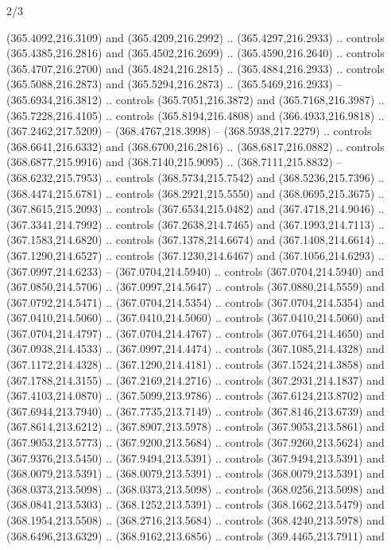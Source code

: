 \begin{flagdescription}{2/3}
\begin{scope}[xshift=0.5\flaglength,yshift=0.5\flagwidth,scale=\flagwidth/495.65]
\begin{scope}[y=0.8pt, x=0.8pt, yscale=-1,shift={(-463.76,-309.78)}]
  (365.4092,216.3109) and (365.4209,216.2992) .. (365.4297,216.2933) .. controls
  (365.4385,216.2816) and (365.4502,216.2699) .. (365.4590,216.2640) .. controls
  (365.4707,216.2700) and (365.4824,216.2815) .. (365.4884,216.2933) .. controls
  (365.5088,216.2873) and (365.5294,216.2873) .. (365.5469,216.2933) --
  (365.6934,216.3812) .. controls (365.7051,216.3872) and (365.7168,216.3987) ..
  (365.7228,216.4105) .. controls (365.8194,216.4808) and (366.4933,216.9818) ..
  (367.2462,217.5209) -- (368.4767,218.3998) -- (368.5938,217.2279) .. controls
  (368.6641,216.6332) and (368.6700,216.2816) .. (368.6817,216.0882) .. controls
  (368.6877,215.9916) and (368.7140,215.9095) .. (368.7111,215.8832) --
  (368.6232,215.7953) .. controls (368.5734,215.7542) and (368.5236,215.7396) ..
  (368.4474,215.6781) .. controls (368.2921,215.5550) and (368.0695,215.3675) ..
  (367.8615,215.2093) .. controls (367.6534,215.0482) and (367.4718,214.9046) ..
  (367.3341,214.7992) .. controls (367.2638,214.7465) and (367.1993,214.7113) ..
  (367.1583,214.6820) .. controls (367.1378,214.6674) and (367.1408,214.6614) ..
  (367.1290,214.6527) .. controls (367.1230,214.6467) and (367.1056,214.6293) ..
  (367.0997,214.6233) -- (367.0704,214.5940) .. controls (367.0704,214.5940) and
  (367.0850,214.5706) .. (367.0997,214.5647) .. controls (367.0880,214.5559) and
  (367.0792,214.5471) .. (367.0704,214.5354) .. controls (367.0704,214.5354) and
  (367.0410,214.5060) .. (367.0410,214.5060) .. controls (367.0410,214.5060) and
  (367.0704,214.4797) .. (367.0704,214.4767) .. controls (367.0764,214.4650) and
  (367.0938,214.4533) .. (367.0997,214.4474) .. controls (367.1085,214.4328) and
  (367.1172,214.4328) .. (367.1290,214.4181) .. controls (367.1524,214.3858) and
  (367.1788,214.3155) .. (367.2169,214.2716) .. controls (367.2931,214.1837) and
  (367.4103,214.0870) .. (367.5099,213.9786) .. controls (367.6124,213.8702) and
  (367.6944,213.7940) .. (367.7735,213.7149) .. controls (367.8146,213.6739) and
  (367.8614,213.6212) .. (367.8907,213.5978) .. controls (367.9053,213.5861) and
  (367.9053,213.5773) .. (367.9200,213.5684) .. controls (367.9260,213.5624) and
  (367.9376,213.5450) .. (367.9494,213.5391) .. controls (367.9494,213.5391) and
  (368.0079,213.5391) .. (368.0079,213.5391) .. controls (368.0079,213.5391) and
  (368.0373,213.5098) .. (368.0373,213.5098) .. controls (368.0256,213.5098) and
  (368.0841,213.5303) .. (368.1252,213.5391) .. controls (368.1662,213.5479) and
  (368.1954,213.5508) .. (368.2716,213.5684) .. controls (368.4240,213.5978) and
  (368.6496,213.6329) .. (368.9162,213.6856) .. controls (369.4465,213.7911) and

\end{scope}
\end{scope}
\end{flagdescription}

